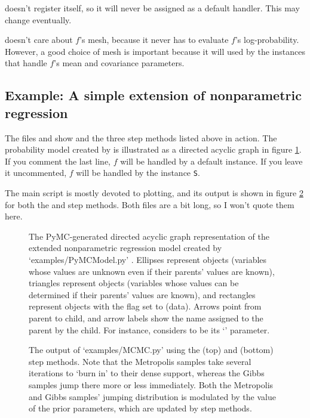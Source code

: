 \documentclass[]{manual}
\begin{document}
 doesn't register itself, so it will never be assigned as a default handler. This may change eventually.

 doesn't care about $f$'s mesh, because it never has to evaluate $f$'s log-probability. However, a good choice of mesh is important because it will used by the  instances that handle $f$'s mean and covariance parameters.  

\subsection{Example: A simple extension of nonparametric regression}\label{sub:BasicMCMC}
The files  and  show  and the three step methods listed above in action. The probability model created by  is illustrated as a directed acyclic graph in figure \ref{fig:unobservedModel}. If you comment the last line, $f$ will be handled by a default  instance. If you leave it uncommented, $f$ will be handled by the  instance \texttt{S}.  

The main script  is mostly devoted to plotting, and its output is shown in figure \ref{fig:MCMCOutput} for both the  and  step methods. Both files are a bit long, so I won't quote them here. 
% 

\begin{figure}
    \centering
    \caption{The PyMC-generated directed acyclic graph representation of the extended nonparametric regression model created by \textsf{`examples/PyMCModel.py'} . Ellipses represent  objects (variables whose values are unknown even if their parents' values are known), triangles represent  objects (variables whose values can be determined if their parents' values are known), and rectangles represent  objects with the  flag set to  (data). Arrows point from parent to child, and arrow labels show the name assigned to the parent by the child. For instance,  considers  to be its `' parameter.}
    \label{fig:unobservedModel}
\end{figure}

\begin{figure}
    \centering
    \caption{The output of {\sffamily `examples/MCMC.py'} using the  (top) and  (bottom) step methods. Note that the Metropolis samples take several iterations to `burn in' to their dense support, whereas the Gibbs samples jump there more or less immediately. Both the Metropolis and Gibbs samples' jumping distribution is modulated by the value of the prior parameters, which are updated by  step methods.}
    \label{fig:MCMCOutput}
\end{figure}
\end{document}
